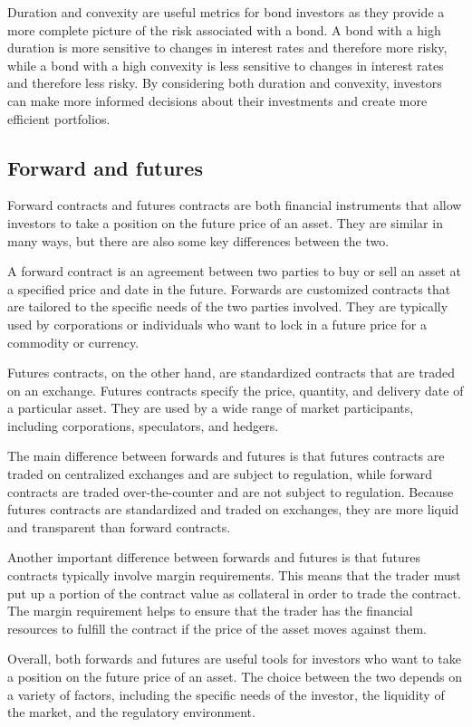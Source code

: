 \documentclass[12pt, a4paper, oneside]{article}
\begin{document}
Duration and convexity are useful metrics for bond investors as they provide a more complete picture of the risk associated with a bond. A bond with a high duration is more sensitive to changes in interest rates and therefore more risky, while a bond with a high convexity is less sensitive to changes in interest rates and therefore less risky. By considering both duration and convexity, investors can make more informed decisions about their investments and create more efficient portfolios.




\subsection{ Forward and futures }
Forward contracts and futures contracts are both financial instruments that allow investors to take a position on the future price of an asset. They are similar in many ways, but there are also some key differences between the two.

A forward contract is an agreement between two parties to buy or sell an asset at a specified price and date in the future. Forwards are customized contracts that are tailored to the specific needs of the two parties involved. They are typically used by corporations or individuals who want to lock in a future price for a commodity or currency.

Futures contracts, on the other hand, are standardized contracts that are traded on an exchange. Futures contracts specify the price, quantity, and delivery date of a particular asset. They are used by a wide range of market participants, including corporations, speculators, and hedgers.

The main difference between forwards and futures is that futures contracts are traded on centralized exchanges and are subject to regulation, while forward contracts are traded over-the-counter and are not subject to regulation. Because futures contracts are standardized and traded on exchanges, they are more liquid and transparent than forward contracts.

Another important difference between forwards and futures is that futures contracts typically involve margin requirements. This means that the trader must put up a portion of the contract value as collateral in order to trade the contract. The margin requirement helps to ensure that the trader has the financial resources to fulfill the contract if the price of the asset moves against them.

Overall, both forwards and futures are useful tools for investors who want to take a position on the future price of an asset. The choice between the two depends on a variety of factors, including the specific needs of the investor, the liquidity of the market, and the regulatory environment.
\end{document}
